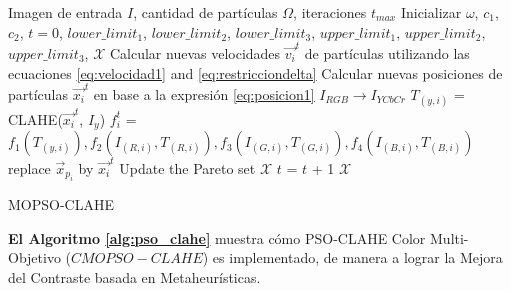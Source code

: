 \begin{algorithm}[H]
\scriptsize
\begin{algorithmic}[1]
\Require Imagen de entrada $I$, cantidad de partículas $\Omega$, iteraciones $t_{max}$ 
\State Inicializar $\omega$, $c_1$, $c_2$, $t=0$, $lower\_limit_1$, $lower\_limit_2$, $lower\_limit_3$, $upper\_limit_1$, $upper\_limit_2$, $upper\_limit_3$, $\mathscr{X}$
        \State Calcular nuevas velocidades $\overrightarrow{v_i}^t$ de partículas utilizando las ecuaciones \eqref{eq:velocidad1} and \eqref{eq:restricciondelta}
        \State Calcular nuevas posiciones de partículas $\overrightarrow{x_i}^t$ en base a la expresión \eqref{eq:posicion1}
        \State $I_{RGB} \longrightarrow I_{YCbCr}$
        \State ${T_{(y,i)}}$ = CLAHE(${\overrightarrow{x_i}^t}$, ${I_y}$)
                \State ${f^t_i}$ = $f_1({T_{(y,i)}}),f_2({I_{(R,i)},T_{(R,i)}}),f_3({I_{(G,i)},T_{(G,i)}}),f_4({I_{(B,i)},T_{(B,i)}})$%
                \State replace $\overrightarrow{x}_{p_i}$ by $\overrightarrow{x_i}^t$
                \EndIf
                \State Update the Pareto set $\mathscr{X}$
                \EndIf
                \State $t$ = $t$ + 1
                \EndFor
                \EndWhile
                \Ensure $\mathscr{X}$
                \end{algorithmic}
                \caption{MOPSO-CLAHE}
                \label{alg:pso_clahe}
                \end{algorithm}

                \textbf {El Algoritmo \ref{alg:pso_clahe}} muestra cómo PSO-CLAHE Color Multi-Objetivo ($CMOPSO-CLAHE$) es implementado, de manera a lograr la Mejora del Contraste basada en Metaheurísticas. 

